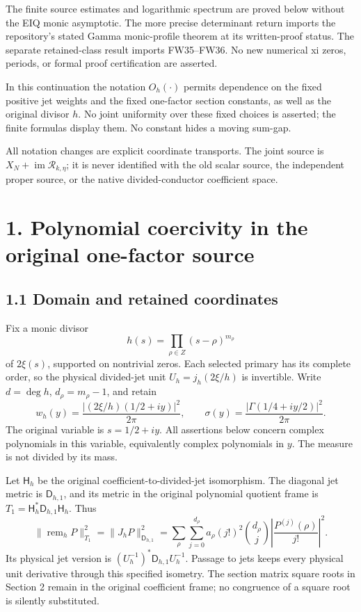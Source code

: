 \documentclass[11pt]{article}
\begin{document}
The finite source estimates and logarithmic spectrum are proved below without the EIQ monic asymptotic. The more precise determinant return imports the repository's stated Gamma monic-profile theorem at its written-proof status. The separate retained-class result imports FW35--FW36. No new numerical xi zeros, periods, or formal proof certification are asserted.

In this continuation the notation \(O_h(\cdot)\) permits dependence on the fixed positive jet weights and the fixed one-factor section constants, as well as the original divisor \(h\). No joint uniformity over these fixed choices is asserted; the finite formulas display them. No constant hides a moving sum-gap.

All notation changes are explicit coordinate transports. The joint source is \(X_N+\operatorname{im}\mathcal R_{k,\eta}\); it is never identified with the old scalar source, the independent proper source, or the native divided-conductor coefficient space.

\section{1. Polynomial coercivity in the original one-factor source}\label{polynomial-coercivity-in-the-original-one-factor-source}

\subsection{1.1 Domain and retained coordinates}\label{domain-and-retained-coordinates}

Fix a monic divisor \[
h(s)=\prod_{\rho\in Z}(s-\rho)^{m_\rho}
\] of \(2\xi(s)\), supported on nontrivial zeros. Each selected primary has its complete order, so the physical divided-jet unit \(U_h=j_h(2\xi/h)\) is invertible. Write \(d=\deg h\), \(d_\rho=m_\rho-1\), and retain \[
w_h(y)=\frac{|(2\xi/h)(1/2+iy)|^2}{2\pi},\qquad
\sigma(y)=\frac{|\Gamma(1/4+iy/2)|^2}{2\pi}.
\] The original variable is \(s=1/2+iy\). All assertions below concern complex polynomials in this variable, equivalently complex polynomials in \(y\). The measure is not divided by its mass.

Let \(\mathsf H_h\) be the original coefficient-to-divided-jet isomorphism. The diagonal jet metric is \(\mathsf D_{h,1}\), and its metric in the original polynomial quotient frame is \(T_1=\mathsf H_h^*\mathsf D_{h,1}\mathsf H_h\). Thus \[
\|\operatorname{rem}_hP\|_{T_1}^2
=\|J_hP\|_{\mathsf D_{h,1}}^2
 =\sum_{\rho}\sum_{j=0}^{d_\rho}
 a_\rho(j!)^2\binom{d_\rho}{j}
 \left|\frac{P^{(j)}(\rho)}{j!}\right|^2.
\] Its physical jet version is \((U_h^{-1})^*\mathsf D_{h,1}U_h^{-1}\). Passage to jets keeps every physical unit derivative through this specified isometry. The section matrix square roots in Section 2 remain in the original coefficient frame; no congruence of a square root is silently substituted.
\end{document}
